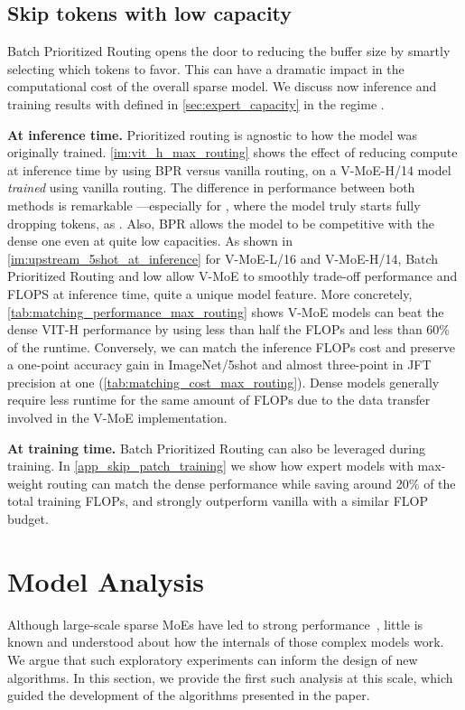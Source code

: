 \documentclass{article}
\newcommand{\abbv}{{V-MoE}}
\newcommand{\maxrouting}{Batch Prioritized Routing}
\begin{document}
\subsection{Skip tokens with low capacity \texorpdfstring{}{C}}
\maxrouting{} opens the door to reducing the buffer size by smartly selecting which tokens to favor. This can have a dramatic impact in the computational cost of the overall sparse model.
We discuss now inference and training results with  defined in \cref{sec:expert_capacity} in the regime  . 

\textbf{At inference time.}
Prioritized routing is agnostic to how the model was originally trained.
\cref{im:vit_h_max_routing} shows the effect of reducing compute at inference time by using BPR versus vanilla routing, on a \abbv{}-H/14 model \emph{trained} using vanilla routing.
The difference in performance between both methods is remarkable ---especially for , where the model truly starts fully dropping tokens, as .
Also, BPR allows the model to be competitive with the dense one even at quite low capacities.
As shown in \cref{im:upstream_5shot_at_inference} for \abbv{}-L/16 and \abbv{}-H/14, \maxrouting{} and low  allow \abbv{} to smoothly trade-off performance and FLOPS at inference time, quite a unique model feature.
More concretely, \cref{tab:matching_performance_max_routing} shows \abbv{} models can beat the dense VIT-H performance by using less than half the FLOPs and less than 60\% of the runtime.
Conversely, we can match the inference FLOPs cost and preserve a one-point accuracy gain in ImageNet/5shot and almost three-point in JFT precision at one (\cref{tab:matching_cost_max_routing}).
Dense models generally require less runtime for the same amount of FLOPs due to the data transfer involved in the \abbv{} implementation.

\textbf{At training time.}
\maxrouting{} can also be leveraged during training.
In \cref{app_skip_patch_training} we show how expert models with max-weight  routing can match the dense performance while saving around 20\% of the total training FLOPs, and strongly outperform vanilla with a similar FLOP budget. \section{Model Analysis}
\label{sec:model_analysis}


Although large-scale sparse MoEs have led to strong performance~\cite{fedus2021switch, lepikhin2020gshard, shazeer2017outrageously},
little is known and understood about how the internals of those complex models work.
We argue that such exploratory experiments can inform the design of new algorithms. In this section, we provide the first such analysis at this scale, which guided the development of the algorithms presented in the paper.
\end{document}
